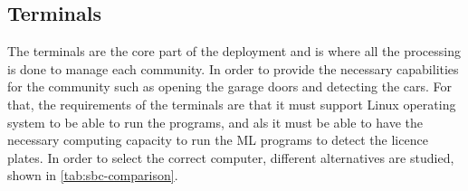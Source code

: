 \subsection{Terminals}\label{subsec:design_terminal}

The terminals are the core part of the deployment and is where all the processing is done to manage each community. In order to provide the necessary capabilities for the community such as opening the garage doors and detecting the cars. For that, the requirements of the terminals are that it must support Linux operating system to be able to run the programs, and als it must be able to have the necessary computing capacity to run the \gls{ML} programs to detect the licence plates. In order to select the correct computer, different alternatives are studied, shown in \cref{tab:sbc-comparison}.


